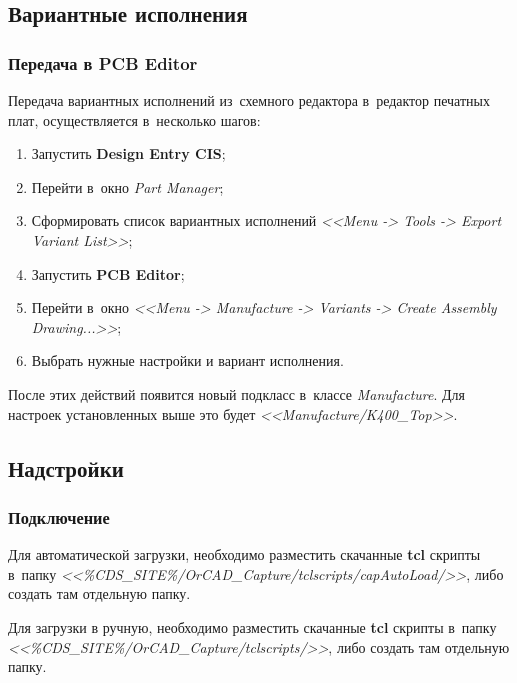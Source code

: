 \newpage
\subsection{Вариантные исполнения} \label{ssec:variant_list}



\subsubsection{Передача в PCB Editor} \label{sssec:export_variant_list}

Передача вариантных исполнений из~схемного редактора в~редактор печатных плат, осуществляется в~несколько шагов:
\begin{enumerate}
	\item Запустить \textbf{Design Entry CIS};
	
	\item Перейти в~окно \textit{Part Manager};
	
	\item Сформировать список вариантных исполнений \textit{<<Menu -> Tools -> Export Variant List>>}; 
	
	\item Запустить \textbf{PCB Editor};
	
	\item Перейти в~окно \textit{<<Menu -> Manufacture -> Variants -> Create Assembly Drawing...>>};
	
	\item Выбрать нужные настройки и вариант исполнения.
	
		\begin{figure}[H]
		\end{figure}	
	
\end{enumerate}

После этих действий появится новый подкласс в~классе \textit{Manufacture}. Для настроек установленных выше это будет \textit{<<Manufacture/K400\_Top>>}.


\newpage
\subsection{Надстройки} \label{ssec:variant_list} \label{ssec:cis_plugin}



\subsubsection{Подключение} \label{sssec:cis_plugin_setup}

Для автоматической загрузки, необходимо разместить скачанные \textbf{tcl} скрипты в~папку \textit{<<\%CDS\_SITE\%/OrCAD\_Capture/tclscripts/capAutoLoad/>>}, либо создать там отдельную папку.

Для загрузки в ручную, необходимо разместить скачанные \textbf{tcl} скрипты в~папку \textit{<<\%CDS\_SITE\%/OrCAD\_Capture/tclscripts/>>}, либо создать там отдельную папку.


